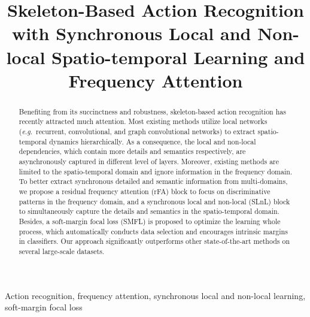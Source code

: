\documentclass{article}
\begin{document}
\sloppy
\ninept 

\def\x{{\mathbf x}}
\def\L{{\cal L}}

\newcommand{\etal}{\textit{et al}.} \newcommand{\ie}{\textit{i}.\textit{e}.}
\newcommand{\eg}{\textit{e}.\textit{g}.}
\newcommand{\myfont}{\fontsize{8pt}{\baselineskip}\selectfont}


\title{Skeleton-Based Action Recognition with Synchronous Local and Non-local Spatio-temporal Learning and Frequency Attention}
\address{\textsuperscript{1}Brainnetome Center \& National Laboratory of Pattern Recognition, \\
	Institute of Automation, Chinese Academy of Sciences\\
	\textsuperscript{2}CAS Center for Excellence in Brain Science and Intelligence Technology\\
	\textsuperscript{3}University of Chinese Academy of Sciences\\
	\{guyue.hu, bo.cui, shan.yu\}@nlpr.ia.ac.cn}


\maketitle


\begin{abstract}
Benefiting from its succinctness and robustness, skeleton-based action recognition has recently attracted much attention. Most existing methods utilize local networks (\eg~recurrent, convolutional, and graph convolutional networks) to extract spatio-temporal dynamics hierarchically. As a consequence, the local and non-local dependencies, which contain more details and semantics respectively, are asynchronously captured in different level of layers. Moreover, existing methods are limited to the spatio-temporal domain and ignore information in the frequency domain. To better extract synchronous detailed and semantic information from multi-domains, we propose a residual frequency attention (rFA) block to focus on discriminative patterns in the frequency domain, and a synchronous local and non-local (SLnL) block to simultaneously capture the details and semantics in the spatio-temporal domain. Besides, a soft-margin focal loss (SMFL) is proposed to optimize the learning whole process, which automatically conducts data selection and encourages intrinsic margins in classifiers. Our approach significantly outperforms other state-of-the-art methods on several large-scale datasets.
\end{abstract}
\begin{keywords}
Action recognition, frequency attention, synchronous local and non-local learning, soft-margin focal loss
\end{keywords}
\end{document}
